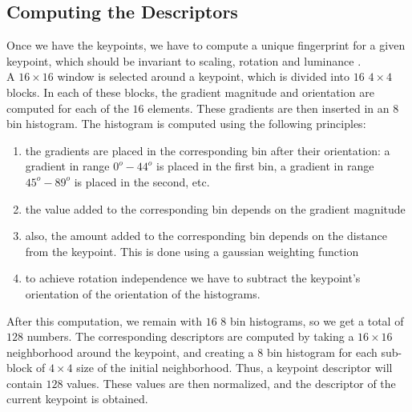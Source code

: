 \subsection{Computing the Descriptors}
Once we have the keypoints, we have to compute a unique fingerprint for a given keypoint, which should be invariant to scaling, rotation and luminance \cite{siftImplementation}.\\
A $16\times16$ window is selected around a keypoint, which is divided into $16$ $4\times4$ blocks.
In each of these blocks, the gradient magnitude and orientation are computed for each of the $16$ elements.
These gradients are then inserted in an $8$ bin histogram. The histogram is computed using the following principles:
\begin{enumerate}
	\item the gradients are placed in the corresponding bin after their orientation: a gradient in range $0^o-44^o$ is placed in the first bin, a gradient in range $45^o-89^o$ is placed in the second, etc.
	\item the value added to the corresponding bin depends on the gradient magnitude
	\item also, the amount added to the corresponding bin depends on the distance from the keypoint. This is done using a gaussian weighting function
	\item to achieve rotation independence we have to subtract the keypoint's  orientation of the orientation of the histograms.
\end{enumerate}

After this computation, we remain with $16$ $8$ bin histograms, so we get a total of $128$ numbers.
The corresponding descriptors are computed by taking a $16\times16$ neighborhood around the keypoint, and creating a $8$ bin histogram for each sub-block of $4\times4$ size of the initial neighborhood. Thus, a keypoint descriptor will contain $128$ values.
These values are then normalized, and the descriptor of the current keypoint is obtained.

